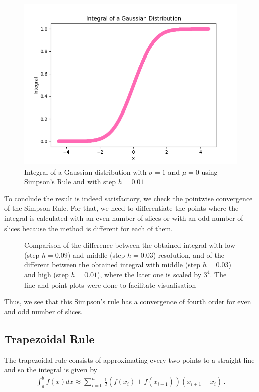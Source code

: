 \documentclass[11pt]{article}
\begin{document}
\begin{figure}[H]
    \centering
    \includegraphics[width=0.5\linewidth]{Images/gauss_integral.png}
    \caption{Integral of a Gaussian distribution with $\sigma=1$ and $\mu=0$ using Simpson's Rule and with step $h=0.01$}\label{fig:gauss_integral}
\end{figure}

To conclude the result is indeed satisfactory, we check the pointwise convergence of the Simpson Rule. For that, we need to differentiate the points where the integral is calculated with an even number of slices or with an odd number of slices because the method is different for each of them.

\begin{figure}[H]
    \centering
    \caption{Comparison of the difference between the obtained integral with low (step $h = 0.09$) and middle (step $h = 0.03$) resolution, and of the different between the obtained integral with middle (step $h = 0.03$) and high (step $h = 0.01$), where the later one is scaled by $3^4$. The line and point plots were done to facilitate visualisation}\label{fig:simp_conv}
\end{figure}

Thus, we see that this Simpson's rule has a convergence of fourth order for even and odd number of slices.

\subsection{Trapezoidal Rule}

The trapezoidal rule consists of approximating every two points to a straight line and so the integral is given by
\begin{gather}
    \int_a^b f(x)dx \approx \sum_{i=0}^{n} \frac{1}{2}(f(x_i)+f(x_{i+1}))(x_{i+1}-x_i) \, .
\end{gather}
\end{document}
